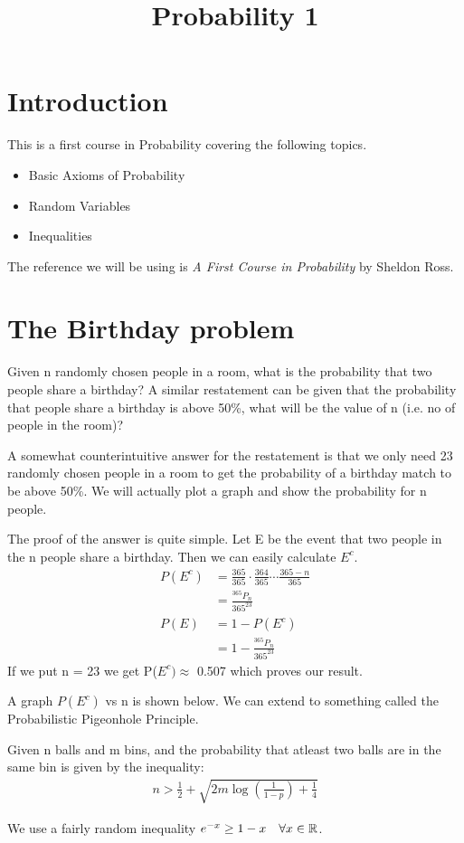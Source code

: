 \documentclass[a4paper]{article}
\title{Probability 1}
\begin{document}

\tableofcontents
\newpage

\section{Introduction}
This is a first course in Probability covering the following topics.
\begin{itemize}
  \item Basic Axioms of Probability
  \item Random Variables
  \item Inequalities
\end{itemize}
The reference we will be using is \emph{A First Course in Probability} by Sheldon Ross.
\section{The Birthday problem}
\begin{problem}
    Given n randomly chosen people in a room, what is the probability that two people share a birthday? A similar 
    restatement can be given that the probability that people share a birthday is above 50\%, 
    what will be the value of n (i.e. no of people in the room)?
\end{problem}
A somewhat counterintuitive answer for the restatement is that we only need 23 randomly chosen 
people in a room to get the probability of a birthday match to be above 50\%. We will actually 
plot a graph and show the probability for n people.
\begin{explanation}
  The proof of the answer is quite simple. Let E be the event that two people in the n people 
  share a birthday. Then we can easily calculate \(E^c\).
 \begin{align*}
     P(E^c) & = \frac{365}{365} \cdot \frac{364}{365} \cdots \frac{365-n}{365} \\ 
            & = \frac{^{365}P_n}{365^{23}} \\ 
     P(E) &= 1 - P(E^c)\\ 
          &= 1- \frac{^{365}P_n}{365^{23}}
 \end{align*}
 If we  put n = 23  we get P(\(E^c) \approx\)  0.507 which proves our result.
\end{explanation}
A graph \(P(E^c)\) vs n is shown below.
We can extend to something called the Probabilistic Pigeonhole Principle.
\begin{theorem}
  Given n balls and m bins, and the probability that atleast two balls are in the same bin is 
  given by the inequality:
 \begin{align}
     n > \frac{1}{2} + \sqrt{2m\log(\frac{1}{1-p})+\frac{1}{4}}
 \end{align}
\end{theorem}
\begin{explanation}
    We use a fairly random inequality \(e^{-x}\ge1-x \quad \forall x\in \mathbb{R} \).
\end{explanation}
\end{document}
